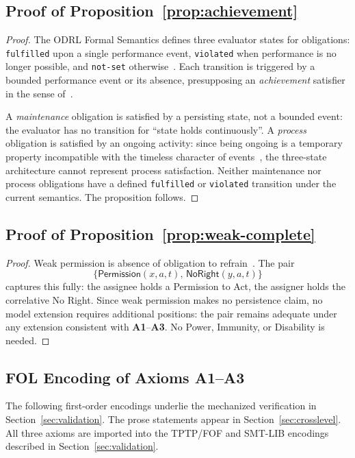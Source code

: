\documentclass{IOS-Book-Article}
\newcommand{\PermPos}{\mathsf{Permission}}   %
\newcommand{\NoRight}{\mathsf{NoRight}}      %
\theoremstyle{definition}
\begin{document}
\subsection*{Proof of Proposition~\ref{prop:achievement}}
\label{app:proof:achievement}
\begin{proof}
The ODRL Formal Semantics defines three evaluator states for
obligations: \texttt{fulfilled} upon a single performance
event, \texttt{violated} when performance is no longer
possible, and \texttt{not-set}
otherwise~\cite[§6]{odrl-formal-semantics}. Each transition
is triggered by a bounded performance event or its absence,
presupposing an \emph{achievement} satisfier in the
sense of~\cite{wright1963norm,guarino2024processes}.

A \emph{maintenance} obligation is satisfied by a persisting
state, not a bounded event: the evaluator has no transition
for ``state holds continuously''. A \emph{process} obligation
is satisfied by an ongoing activity: since being ongoing is
a temporary property incompatible with the timeless character
of events~\cite{guarino2024processes}, the three-state
architecture cannot represent process satisfaction. Neither
maintenance nor process obligations have a defined
\texttt{fulfilled} or \texttt{violated} transition under the
current semantics. The proposition follows.
\end{proof}

\subsection*{Proof of Proposition~\ref{prop:weak-complete}}
\label{app:proof:weak}
\begin{proof}
Weak permission is absence of obligation to
refrain~\cite{mcnamara2021deontic}. The pair
\[
\{\PermPos(x,a,t),\,\NoRight(y,a,t)\}
\]
captures this fully: the assignee holds a Permission to Act,
the assigner holds the correlative No Right. Since weak
permission makes no persistence claim, no model extension
requires additional positions: the pair remains adequate
under any extension consistent with \textbf{A1}--\textbf{A3}.
No Power, Immunity, or Disability is needed.
\end{proof}

\subsection*{FOL Encoding of Axioms A1--A3}
\label{app:A1A3}
\noindent The following first-order encodings underlie the
mechanized verification in Section~\ref{sec:validation}.
The prose statements appear in Section~\ref{sec:crosslevel}.
All three axioms are imported into the TPTP/FOF and SMT-LIB
encodings described in Section~\ref{sec:validation}.
\end{document}
